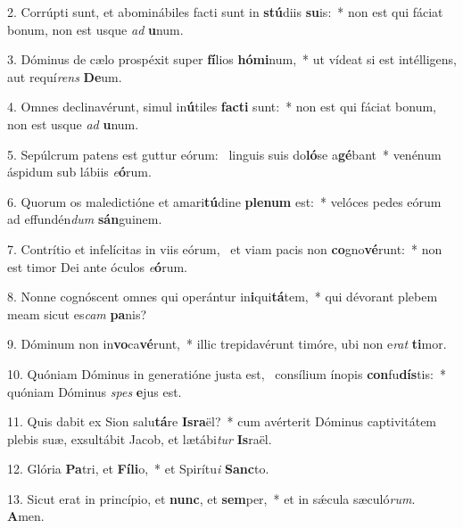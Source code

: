 2. Corrúpti sunt, et abominábiles facti sunt in \textbf{stú}diis \textbf{su}is:~*  non est qui fáciat bonum, non est usque \textit{ad} \textbf{u}num.\

3. Dóminus de cælo prospéxit super \textbf{fí}lios \textbf{hó}\textbf{mi}num,~*  ut vídeat si est intélligens, aut requí\textit{rens} \textbf{De}um.\

4. Omnes declinavérunt, simul in\textbf{ú}tiles \textbf{fac}\textbf{ti} sunt:~*  non est qui fáciat bonum, non est usque \textit{ad} \textbf{u}num.\

5. Sepúlcrum patens est guttur eórum: \dag\  linguis suis do\textbf{ló}se a\textbf{gé}bant~*  venénum áspidum sub lábiis \textit{e}\textbf{ó}rum.\

6. Quorum os maledictióne et amari\textbf{tú}dine \textbf{ple}\textbf{num} est:~*  velóces pedes eórum ad effundén\textit{dum} \textbf{sán}guinem.\

7. Contrítio et infelícitas in viis eórum, \dag\  et viam pacis non \textbf{co}gno\textbf{vé}runt:~*  non est timor Dei ante óculos \textit{e}\textbf{ó}rum.\

8. Nonne cognóscent omnes qui operántur in\textbf{i}qui\textbf{tá}tem,~*  qui dévorant plebem meam sicut es\textit{cam} \textbf{pa}nis?\

9. Dóminum non in\textbf{vo}ca\textbf{vé}runt,~*  illic trepidavérunt timóre, ubi non e\textit{rat} \textbf{ti}mor.\

10. Quóniam Dóminus in generatióne justa est, \dag\  consílium ínopis \textbf{con}fu\textbf{dís}tis:~*  quóniam Dóminus \textit{spes} \textbf{e}jus est.\

11. Quis dabit ex Sion salu\textbf{tá}re \textbf{Is}\textbf{ra}ël?~*  cum avérterit Dóminus captivitátem plebis suæ, exsultábit Jacob, et lætábi\textit{tur} \textbf{Is}raël.\

12. Glória \textbf{Pa}tri, et \textbf{Fí}\textbf{li}o,~*  et Spirítu\textit{i} \textbf{Sanc}to.\

13. Sicut erat in princípio, et \textbf{nunc}, et \textbf{sem}per,~*  et in sǽcula sæculó\textit{rum}. \textbf{A}men.\

